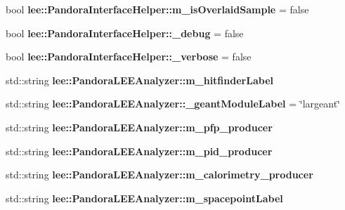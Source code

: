 \begin{DoxyCompactItemize}
\item 
\hypertarget{group__lee_ga406cf8f7ace556f0b1dcfb9e4722efb8}{bool {\bfseries lee\-::\-Pandora\-Interface\-Helper\-::m\-\_\-is\-Overlaid\-Sample} = false}\label{group__lee_ga406cf8f7ace556f0b1dcfb9e4722efb8}

\item 
\hypertarget{group__lee_gab8e095d1281cac84da211ba143991440}{bool {\bfseries lee\-::\-Pandora\-Interface\-Helper\-::\-\_\-debug} = false}\label{group__lee_gab8e095d1281cac84da211ba143991440}

\item 
\hypertarget{group__lee_ga39213dbd10338e8fefb3b6756f2e9cb3}{bool {\bfseries lee\-::\-Pandora\-Interface\-Helper\-::\-\_\-verbose} = false}\label{group__lee_ga39213dbd10338e8fefb3b6756f2e9cb3}

\item 
\hypertarget{group__lee_gaf8a8c564772112b2c47945afcf674484}{std\-::string {\bfseries lee\-::\-Pandora\-L\-E\-E\-Analyzer\-::m\-\_\-hitfinder\-Label}}\label{group__lee_gaf8a8c564772112b2c47945afcf674484}

\item 
\hypertarget{group__lee_gaf68d4bc3b81df418e7925567e36e5996}{std\-::string {\bfseries lee\-::\-Pandora\-L\-E\-E\-Analyzer\-::\-\_\-geant\-Module\-Label} = \char`\"{}largeant\char`\"{}}\label{group__lee_gaf68d4bc3b81df418e7925567e36e5996}

\item 
\hypertarget{group__lee_ga4d931b0979f37341d7097520d6cb103d}{std\-::string {\bfseries lee\-::\-Pandora\-L\-E\-E\-Analyzer\-::m\-\_\-pfp\-\_\-producer}}\label{group__lee_ga4d931b0979f37341d7097520d6cb103d}

\item 
\hypertarget{group__lee_gac5fa9ebd50776233ccfbf82f5886411f}{std\-::string {\bfseries lee\-::\-Pandora\-L\-E\-E\-Analyzer\-::m\-\_\-pid\-\_\-producer}}\label{group__lee_gac5fa9ebd50776233ccfbf82f5886411f}

\item 
\hypertarget{group__lee_ga11a0a8879de1549d48e9fdfab8fc9365}{std\-::string {\bfseries lee\-::\-Pandora\-L\-E\-E\-Analyzer\-::m\-\_\-calorimetry\-\_\-producer}}\label{group__lee_ga11a0a8879de1549d48e9fdfab8fc9365}

\item 
\hypertarget{group__lee_ga7a5ae683e3f2b04f71812b689cd08b76}{std\-::string {\bfseries lee\-::\-Pandora\-L\-E\-E\-Analyzer\-::m\-\_\-spacepoint\-Label}}\label{group__lee_ga7a5ae683e3f2b04f71812b689cd08b76}


\end{DoxyCompactItemize}
